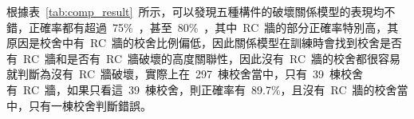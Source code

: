 根據表~\ref{tab:comp_result}~所示，可以發現五種構件的破壞關係模型的表現均不錯，正確率都有超過~75\%~，甚至~80\%~，其中~RC~牆的部分正確率特別高，其原因是校舍中有~RC~牆的校舍比例偏低，因此關係模型在訓練時會找到校舍是否有~RC~牆和是否有~RC~牆破壞的高度關聯性，因此沒有~RC~牆的校舍都很容易就判斷為沒有~RC~牆破壞，實際上在~297~棟校舍當中，只有~39~棟校舍有~RC~牆，如果只看這~39~棟校舍，則正確率有~89.7\%，且沒有~RC~牆的校舍當中，只有一棟校舍判斷錯誤。








